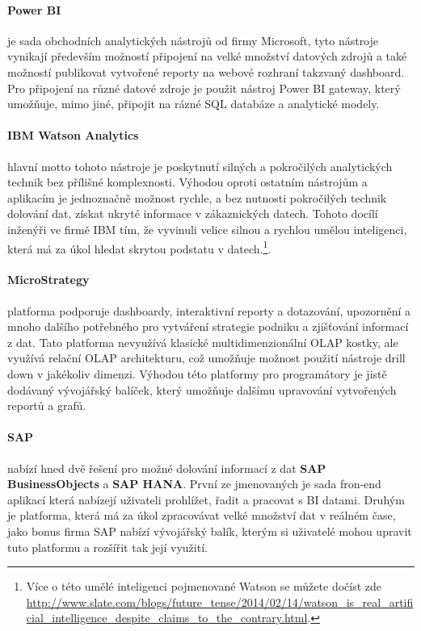 \paragraph{Power BI} je sada obchodních analytických nástrojů od firmy Microsoft, tyto nástroje vynikají především možností připojení na velké množství datových zdrojů a také možností publikovat vytvořené reporty na webové rozhraní takzvaný dashboard. Pro připojení na různé datové zdroje je použit nástroj Power BI gateway, který umožňuje, mimo jiné, připojit na rázné SQL databáze a analytické modely. \cite{powerbi}

\paragraph{IBM Watson Analytics} hlavní motto tohoto nástroje je poskytnutí silných a pokročilých analytických technik bez přílišné komplexnosti. Výhodou oproti ostatním nástrojům a aplikacím je jednoznačně možnost rychle, a bez nutnosti pokročilých technik dolování dat, získat ukryté informace v zákaznických datech. Tohoto docílí inženýři ve firmě IBM tím, že vyvinuli velice silnou a rychlou umělou inteligenci, která má za úkol hledat skrytou podstatu v datech.\footnote{Více o této umělé inteligenci pojmenované Watson se můžete dočíst zde \url{http://www.slate.com/blogs/future_tense/2014/02/14/watson_is_real_artificial_intelligence_despite_claims_to_the_contrary.html}.}. \cite{watson}

\paragraph{MicroStrategy} platforma podporuje dashboardy, interaktivní reporty a dotazování, upozornění a mnoho dalšího potřebného pro vytváření strategie podniku a zjišťování informací z dat. Tato platforma nevyužívá klasické multidimenzionální OLAP kostky, ale využívá relační OLAP architekturu, což umožňuje možnost použití nástroje drill down v jakékoliv dimenzi. Výhodou této platformy pro programátory je jistě dodávaný vývojářský balíček, který umožňuje dalšímu upravování vytvořených reportů a grafů. \cite{microstrategy}

\paragraph{SAP} nabízí hned dvě řešení pro možné dolování informací z dat \textbf{SAP BusinessObjects} a \textbf{SAP HANA}. První ze jmenovaných je sada fron-end aplikací která nabízejí uživateli prohlížet, řadit a pracovat s BI datami. Druhým je platforma, která má za úkol zpracovávat velké množství dat v reálném čase, jako bonus firma SAP nabízí vývojářský balík, kterým si uživatelé mohou upravit tuto platformu a rozšířit tak její využití. \cite{sap}


